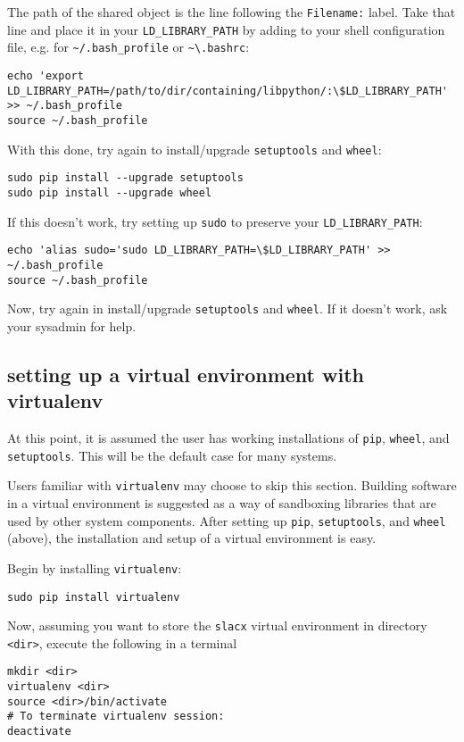 The path of the shared object is the line following the \verb|Filename:| label.
Take that line and place it in your \verb|LD_LIBRARY_PATH| 
by adding to your shell configuration file, 
e.g. for \verb|~/.bash_profile| or \verb|~\.bashrc|:
\begin{lstlisting}
echo 'export LD_LIBRARY_PATH=/path/to/dir/containing/libpython/:\$LD_LIBRARY_PATH' >> ~/.bash_profile
source ~/.bash_profile
\end{lstlisting}

With this done, try again to install/upgrade \verb|setuptools| and \verb|wheel|:
\begin{lstlisting}
sudo pip install --upgrade setuptools 
sudo pip install --upgrade wheel 
\end{lstlisting}
If this doesn't work, try setting up \verb|sudo| to preserve your \verb|LD_LIBRARY_PATH|:
\begin{lstlisting}
echo 'alias sudo='sudo LD_LIBRARY_PATH=\$LD_LIBRARY_PATH' >> ~/.bash_profile
source ~/.bash_profile
\end{lstlisting}
Now, try again in install/upgrade \verb|setuptools| and \verb|wheel|.
If it doesn't work, ask your sysadmin for help.


\subsection{setting up a virtual environment with virtualenv}
\label{subsec:virtualenv}

At this point, it is assumed the user has working installations of
\verb|pip|, \verb|wheel|, and \verb|setuptools|.
This will be the default case for many systems.

Users familiar with \verb|virtualenv| may choose to skip this section.
Building software in a virtual environment is suggested 
as a way of sandboxing libraries that are used by other system components.
After setting up \verb|pip|, \verb|setuptools|, and \verb|wheel| (above),
the installation and setup of a virtual environment is easy.

Begin by installing \verb|virtualenv|:
\begin{lstlisting}
sudo pip install virtualenv
\end{lstlisting}

Now, assuming you want to store the \verb|slacx| virtual environment
in directory \verb|<dir>|,
execute the following in a terminal
\begin{lstlisting}
mkdir <dir> 
virtualenv <dir>
source <dir>/bin/activate
# To terminate virtualenv session:
deactivate
\end{lstlisting}

